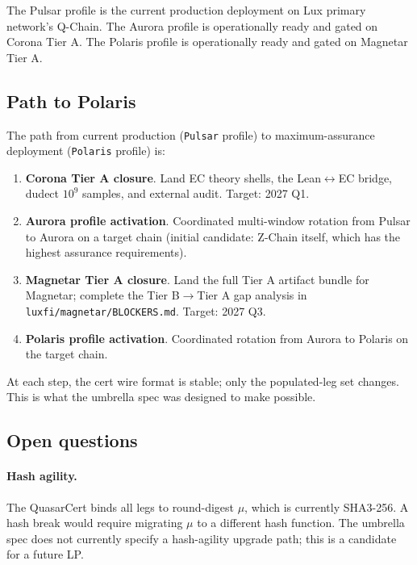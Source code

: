 The Pulsar profile is the current production deployment on Lux
primary network's Q-Chain. The Aurora profile is operationally
ready and gated on Corona Tier A. The Polaris profile is
operationally ready and gated on Magnetar Tier A.

\subsection{Path to Polaris}

The path from current production (\texttt{Pulsar} profile) to
maximum-assurance deployment (\texttt{Polaris} profile) is:

\begin{enumerate}[leftmargin=2em,nosep]
\item \textbf{Corona Tier A closure}. Land EC theory shells, the
      Lean$\leftrightarrow$EC bridge, dudect $10^9$ samples, and
      external audit. Target: 2027 Q1.
\item \textbf{Aurora profile activation}. Coordinated multi-window
      rotation from Pulsar to Aurora on a target chain (initial
      candidate: Z-Chain itself, which has the highest assurance
      requirements).
\item \textbf{Magnetar Tier A closure}. Land the full Tier A
      artifact bundle for Magnetar; complete the Tier B$\rightarrow$Tier A
      gap analysis in \texttt{luxfi/magnetar/BLOCKERS.md}.
      Target: 2027 Q3.
\item \textbf{Polaris profile activation}. Coordinated rotation
      from Aurora to Polaris on the target chain.
\end{enumerate}

At each step, the cert wire format is stable; only the populated-leg
set changes. This is what the umbrella spec was designed to make
possible.

\subsection{Open questions}

\paragraph{Hash agility.} The QuasarCert binds all legs to
round-digest $\mu$, which is currently SHA3-256. A hash break
would require migrating $\mu$ to a different hash function. The
umbrella spec does not currently specify a hash-agility upgrade
path; this is a candidate for a future LP.

